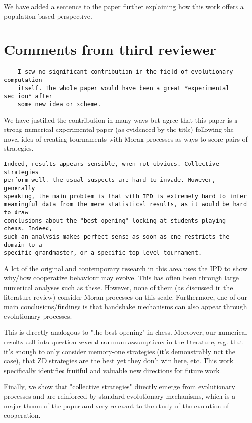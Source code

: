 \documentclass[a4]{article}
\begin{document}
We have added a sentence to the paper further explaining how this work offers a
population based perspective.

\section{Comments from third reviewer}

\begin{verbatim}
    I saw no significant contribution in the field of evolutionary computation
    itself. The whole paper would have been a great *experimental section* after
    some new idea or scheme.
\end{verbatim}

We have justified the contribution in many ways but agree that this paper is a
strong numerical experimental paper (as evidenced by the title) following the
novel idea of creating tournaments with Moran processes as ways to score pairs of
strategies.

\begin{verbatim}
Indeed, results appears sensible, when not obvious. Collective strategies
perform well, the usual suspects are hard to invade. However, generally
speaking, the main problem is that with IPD is extremely hard to infer
meaningful data from the mere statistical results, as it would be hard to draw
conclusions about the "best opening" looking at students playing chess. Indeed,
such an analysis makes perfect sense as soon as one restricts the domain to a
specific grandmaster, or a specific top-level tournament.
\end{verbatim}

A lot of the original and contemporary research in this area uses the IPD to
show why/how
cooperative behaviour may evolve. This has often been through large numerical
analyses such as these. However, none of them (as discussed in the literature
review) consider Moran processes on this scale. Furthermore, one of our main
conclusions/findings is that handshake mechanisms can also appear through
evolutionary processes.

This is directly analogous to "the best opening" in chess. Moreover, our
numerical results call into question several common assumptions in the
literature, e.g. that it's enough to only consider memory-one strategies (it's
demonstrably not the case), that ZD strategies are the best yet they don't win
here, etc. This work specifically identifies fruitful and valuable new
directions for future work.

Finally, we show that "collective strategies" directly emerge from evolutionary
processes and are reinforced by standard evolutionary mechanisms, which is a
major theme of the paper and very relevant to the study of the evolution of
cooperation.
\end{document}
